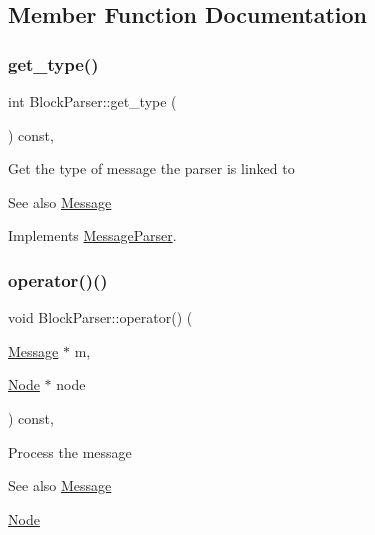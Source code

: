 \subsection{Member Function Documentation}
\mbox{\label{classBlockParser_aa7334a81b976ec6244c0992cda44a824}} 
\subsubsection{\texorpdfstring{get\+\_\+type()}{get\_type()}}
{\footnotesize\ttfamily int Block\+Parser\+::get\+\_\+type (\begin{DoxyParamCaption}{ }\end{DoxyParamCaption}) const\hspace{0.3cm}{\ttfamily [final]}, {\ttfamily [virtual]}}

Get the type of message the parser is linked to \begin{DoxySeeAlso}{See also}
\mbox{\hyperlink{classMessage}{Message}} 
\end{DoxySeeAlso}


Implements \mbox{\hyperlink{classMessageParser_aa7c495d7b28a394e5752ca25ffff69d8}{Message\+Parser}}.

\mbox{\label{classBlockParser_acc2f5e6a6d3a30464454cfc85ff7ba9a}} 
\subsubsection{\texorpdfstring{operator()()}{operator()()}}
{\footnotesize\ttfamily void Block\+Parser\+::operator() (\begin{DoxyParamCaption}\item[{\mbox{\hyperlink{classMessage}{Message}} $\ast$}]{m,  }\item[{\mbox{\hyperlink{classNode}{Node}} $\ast$}]{node }\end{DoxyParamCaption}) const\hspace{0.3cm}{\ttfamily [final]}, {\ttfamily [virtual]}}

Process the message \begin{DoxySeeAlso}{See also}
\mbox{\hyperlink{classMessage}{Message}} 

\mbox{\hyperlink{classNode}{Node}}
\end{DoxySeeAlso}

